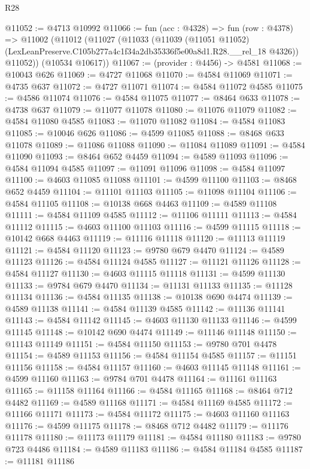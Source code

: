 \begin{lexlean}{R28}
\begin{coremodule}
@11052 := @4713 @10992
@11066 := fun (acc : @4328) =>
  fun (row : @4378) =>
  @11002
    (@11012
      (@11027
        (@11033
          (@11039
            (@11051 @11052)
            (LexLeanPreserve.C105b277a4c1f34a2db35336f5e00a8d1.R28.__rel_18 @4326))
          @11052))
      (@10534 @10617))
@11067 := (provider : @4456) -> @4581
@11068 := @10043 @626
@11069 := @4727 @11068
@11070 := @4584 @11069
@11071 := @4735 @637
@11072 := @4727 @11071
@11074 := @4584 @11072 @4585
@11075 := @4586 @11074
@11076 := @4584 @11075
@11077 := @8464 @633
@11078 := @4738 @637
@11079 := @11077 @11078
@11080 := @11076 @11079
@11082 := @4584 @11080 @4585
@11083 := @11070 @11082
@11084 := @4584 @11083
@11085 := @10046 @626
@11086 := @4599 @11085
@11088 := @8468 @633 @11078
@11089 := @11086 @11088
@11090 := @11084 @11089
@11091 := @4584 @11090
@11093 := @8464 @652 @4459
@11094 := @4589 @11093
@11096 := @4584 @11094 @4585
@11097 := @11091 @11096
@11098 := @4584 @11097
@11100 := @4603 @11085 @11088
@11101 := @4599 @11100
@11103 := @8468 @652 @4459
@11104 := @11101 @11103
@11105 := @11098 @11104
@11106 := @4584 @11105
@11108 := @10138 @668 @4463
@11109 := @4589 @11108
@11111 := @4584 @11109 @4585
@11112 := @11106 @11111
@11113 := @4584 @11112
@11115 := @4603 @11100 @11103
@11116 := @4599 @11115
@11118 := @10142 @668 @4463
@11119 := @11116 @11118
@11120 := @11113 @11119
@11121 := @4584 @11120
@11123 := @9780 @679 @4470
@11124 := @4589 @11123
@11126 := @4584 @11124 @4585
@11127 := @11121 @11126
@11128 := @4584 @11127
@11130 := @4603 @11115 @11118
@11131 := @4599 @11130
@11133 := @9784 @679 @4470
@11134 := @11131 @11133
@11135 := @11128 @11134
@11136 := @4584 @11135
@11138 := @10138 @690 @4474
@11139 := @4589 @11138
@11141 := @4584 @11139 @4585
@11142 := @11136 @11141
@11143 := @4584 @11142
@11145 := @4603 @11130 @11133
@11146 := @4599 @11145
@11148 := @10142 @690 @4474
@11149 := @11146 @11148
@11150 := @11143 @11149
@11151 := @4584 @11150
@11153 := @9780 @701 @4478
@11154 := @4589 @11153
@11156 := @4584 @11154 @4585
@11157 := @11151 @11156
@11158 := @4584 @11157
@11160 := @4603 @11145 @11148
@11161 := @4599 @11160
@11163 := @9784 @701 @4478
@11164 := @11161 @11163
@11165 := @11158 @11164
@11166 := @4584 @11165
@11168 := @8464 @712 @4482
@11169 := @4589 @11168
@11171 := @4584 @11169 @4585
@11172 := @11166 @11171
@11173 := @4584 @11172
@11175 := @4603 @11160 @11163
@11176 := @4599 @11175
@11178 := @8468 @712 @4482
@11179 := @11176 @11178
@11180 := @11173 @11179
@11181 := @4584 @11180
@11183 := @9780 @723 @4486
@11184 := @4589 @11183
@11186 := @4584 @11184 @4585
@11187 := @11181 @11186

\end{coremodule}
\end{lexlean}
